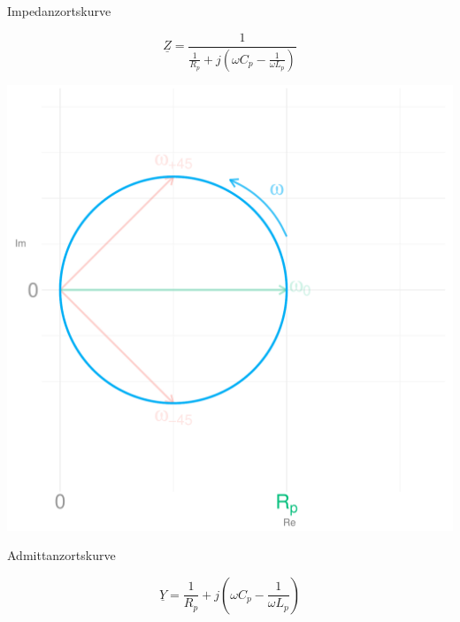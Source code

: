 \documentclass[a4paper, 12pt]{article}
\begin{document}
    \begin{center}
      \large Impedanzortskurve
      \vspace{-0.02128623625220817\paperheight}

      $$\underline{Z} = \frac{1}{\frac{1}{R_p} + j (\omega C_p - \frac{1}{\omega L_p}) }$$

      \begin{center}
        \includegraphics[scale=0.3819660112501051]{./R/2_3/PSK_Impedanz.pdf}
      \end{center}


    \end{center}

    \vspace{0.013155617496424828\paperheight}
    \begin{center}
      \large Admittanzortskurve
    \end{center}

    $$\underline{Y} = \frac{1}{R_p} + j (\omega C_p - \frac{1}{\omega L_p})$$
\end{document}
